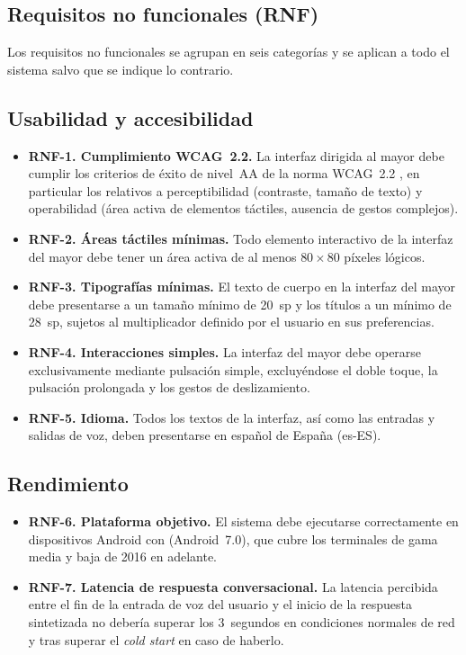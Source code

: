 \subsection{Requisitos no funcionales (RNF)}

Los requisitos no funcionales se agrupan en seis categorías y se aplican a todo el sistema salvo que se indique lo contrario.


\subsection*{Usabilidad y accesibilidad}
\begin{itemize}
    \item \textbf{RNF-1. Cumplimiento WCAG~2.2.} La interfaz dirigida al mayor debe cumplir los criterios de éxito de nivel~AA de la norma WCAG~2.2 \citep{wcag}, en particular los relativos a perceptibilidad (contraste, tamaño de texto) y operabilidad (área activa de elementos táctiles, ausencia de gestos complejos).
    \item \textbf{RNF-2. Áreas táctiles mínimas.} Todo elemento interactivo de la interfaz del mayor debe tener un área activa de al menos $80 \times 80$ píxeles lógicos.
    \item \textbf{RNF-3. Tipografías mínimas.} El texto de cuerpo en la interfaz del mayor debe presentarse a un tamaño mínimo de 20~sp y los títulos a un mínimo de 28~sp, sujetos al multiplicador definido por el usuario en sus preferencias.
    \item \textbf{RNF-4. Interacciones simples.} La interfaz del mayor debe operarse exclusivamente mediante pulsación simple, excluyéndose el doble toque, la pulsación prolongada y los gestos de deslizamiento.
    \item \textbf{RNF-5. Idioma.} Todos los textos de la interfaz, así como las entradas y salidas de voz, deben presentarse en español de España (es-ES).
\end{itemize}

\subsection*{Rendimiento}
\begin{itemize}
    \item \textbf{RNF-6. Plataforma objetivo.} El sistema debe ejecutarse correctamente en dispositivos Android con  (Android~7.0), que cubre los terminales de gama media y baja de 2016 en adelante.
    \item \textbf{RNF-7. Latencia de respuesta conversacional.} La latencia percibida entre el fin de la entrada de voz del usuario y el inicio de la respuesta sintetizada no debería superar los 3~segundos en condiciones normales de red y tras superar el \textit{cold start} en caso de haberlo.
\end{itemize}

